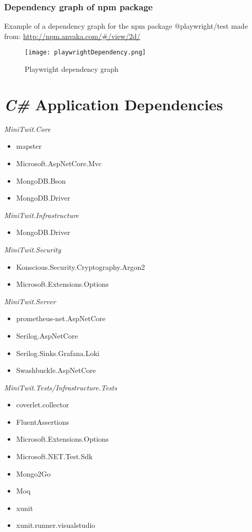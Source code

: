 \subsubsection{Dependency graph of npm package}
Example of a dependency graph for the npm package @playwright/test made from: \url{http://npm.anvaka.com/\#/view/2d/}

\begin{figure}[H]
    \centering
    \texttt{[image: playwrightDependency.png]}
    \caption{Playwright dependency graph}
    \label{fig:playwrightDependencies}
\end{figure}


\section{\textit{C\#} Application Dependencies} \label{appendix:CSharpdependencies}

\textit{MiniTwit.Core}
\begin{itemize}
    \item mapster
    \item Microsoft.AspNetCore.Mvc
    \item MongoDB.Bson
    \item MongoDB.Driver
\end{itemize}


\textit{MiniTwit.Infrastructure}
\begin{itemize}
    \item MongoDB.Driver
\end{itemize}

\textit{MiniTwit.Security}
\begin{itemize}
    \item Konscious.Security.Cryptography.Argon2
    \item Microsoft.Extensions.Options
\end{itemize}

\textit{MiniTwit.Server}
\begin{itemize}
    \item prometheus-net.AspNetCore  
    \item Serilog.AspNetCore    
    \item Serilog.Sinks.Grafana.Loki   
    \item Swashbuckle.AspNetCore 
\end{itemize}


\textit{MiniTwit.Tests/Infrastructure.Tests}
\begin{itemize}
   \item coverlet.collector 
   \item FluentAssertions  
   \item Microsoft.Extensions.Options   
   \item Microsoft.NET.Test.Sdk  
   \item Mongo2Go   
   \item Moq    
   \item xunit     
   \item xunit.runner.visualstudio  
\end{itemize}

